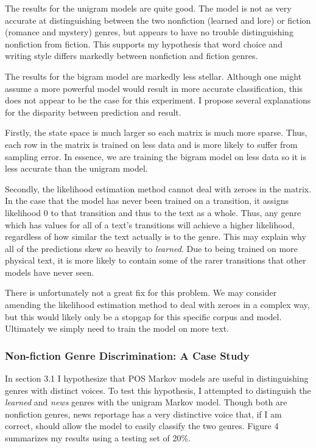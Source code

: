 \documentclass[12pt, titlepage]{article}
\begin{document}
The results for the unigram models are quite good. The model is not as very accurate at distinguishing between the two nonfiction (learned and lore) or fiction (romance and mystery) genres, but appears to have no trouble distinguishing nonfiction from fiction. This supports my hypothesis that word choice and writing style differs markedly between nonfiction and fiction genres.

The results for the bigram model are markedly less stellar. Although one might assume a more powerful model would result in more accurate classification, this does not appear to be the case for this experiment. I propose several explanations for the disparity between prediction and result.

Firstly, the state space is much larger so each matrix is much more sparse. Thus, each row in the matrix is trained on less data and is more likely to suffer from sampling error. In essence, we are training the bigram model on less data so it is less accurate than the unigram model.

Secondly, the likelihood estimation method cannot deal with zeroes in the matrix. In the case that the model has never been trained on a transition, it assigns likelihood 0 to that transition and thus to the text as a whole. Thus, any genre which has values for all of a text's transitions will achieve a higher likelihood, regardless of how similar the text actually is to the genre. This may explain why all of the predictions skew so heavily to \textit{learned}. Due to being trained on more physical text, it is more likely to contain some of the rarer transitions that other models have never seen.

There is unfortunately not a great fix for this problem. We may consider amending the likelihood estimation method to deal with zeroes in a complex way, but this would likely only be a stopgap for this specific corpus and model. Ultimately we simply need to train the model on more text.

\subsubsection{Non-fiction Genre Discrimination: A Case Study}
In section 3.1 I hypothesize that POS Markov models are useful in distinguishing genres with distinct voices. To test this hypothesis, I attempted to distinguish the \textit{learned} and \textit{news} genres with the unigram Markov model. Though both are nonfiction genres, news reportage has a very distinctive voice that, if I am correct, should allow the model to easily classify the two genres. Figure 4 summarizes my results using a testing set of 20\%.
\end{document}
